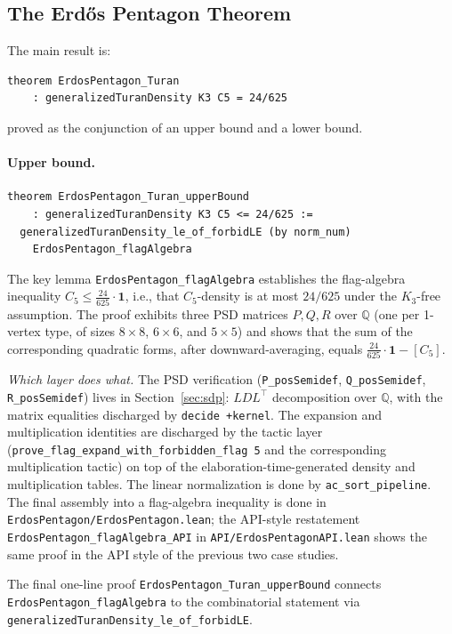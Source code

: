 \documentclass{article}
\newcommand{\Q}{\mathbb{Q}}
\newcommand{\lean}[1]{\texttt{#1}}
\begin{document}
\subsection{The Erd\H{o}s Pentagon Theorem}

The main result is:
\begin{lstlisting}
theorem ErdosPentagon_Turan
    : generalizedTuranDensity K3 C5 = 24/625
\end{lstlisting}
proved as the conjunction of an upper bound and a lower bound.

\paragraph{Upper bound.}
\begin{lstlisting}
theorem ErdosPentagon_Turan_upperBound
    : generalizedTuranDensity K3 C5 <= 24/625 :=
  generalizedTuranDensity_le_of_forbidLE (by norm_num)
    ErdosPentagon_flagAlgebra
\end{lstlisting}
The key lemma \lean{ErdosPentagon\_flagAlgebra} establishes the flag-algebra
inequality $C_5 \leq \frac{24}{625} \cdot \mathbf{1}$, i.e., that
$C_5$-density is at most $24/625$ under the $K_3$-free assumption.  The proof
exhibits three PSD matrices $P, Q, R$ over $\mathbb{Q}$ (one per 1-vertex
type, of sizes $8\times 8$, $6\times 6$, and $5\times 5$) and shows that the
sum of the corresponding quadratic forms, after downward-averaging, equals
$\frac{24}{625} \cdot \mathbf{1} - [C_5]$.

\emph{Which layer does what.}  The PSD verification (\lean{P\_posSemidef},
\lean{Q\_posSemidef}, \lean{R\_posSemidef}) lives in
Section~\ref{sec:sdp}: $LDL^\top$ decomposition over $\Q$, with the matrix
equalities discharged by \lean{decide +kernel}.  The expansion and
multiplication identities are discharged by the tactic layer
(\lean{prove\_flag\_expand\_with\_forbidden\_flag 5} and the corresponding
multiplication tactic) on top of the elaboration-time-generated density and
multiplication tables.  The linear normalization is done by
\lean{ac\_sort\_pipeline}.  The final assembly into a flag-algebra inequality
is done in \lean{ErdosPentagon/ErdosPentagon.lean}; the API-style restatement
\lean{ErdosPentagon\_flagAlgebra\_API} in \lean{API/ErdosPentagonAPI.lean}
shows the same proof in the API style of the previous two case studies.

The final one-line proof \lean{ErdosPentagon\_Turan\_upperBound} connects
\lean{ErdosPentagon\_flagAlgebra} to the combinatorial statement via
\lean{generalizedTuranDensity\_le\_of\_forbidLE}.
\end{document}
